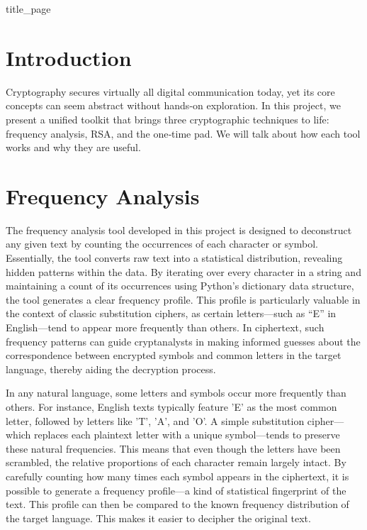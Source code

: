 \documentclass[11pt]{article}
\begin{document}
\raggedcolumns

{title_page}


\begin{multicols}{2}
	\begin{spacing}{1.125}
		\tableofcontents

		\section{Introduction}
		Cryptography secures virtually all digital communication today, yet its core concepts can seem abstract without hands‑on exploration. In this project, we present a unified toolkit that brings three cryptographic techniques to life: frequency analysis, RSA, and the one‑time pad. We will talk about how each tool works and why they are useful.


        	\section{Frequency Analysis}
       		The frequency analysis tool developed in this project is designed to deconstruct any given text by counting the occurrences of each character or symbol. Essentially, the tool converts raw text into a statistical distribution, revealing hidden patterns within the data. By iterating over every character in a string and maintaining a count of its occurrences using Python’s dictionary data structure, the tool generates a clear frequency profile. This profile is particularly valuable in the context of classic substitution ciphers, as certain letters—such as “E” in English—tend to appear more frequently than others. In ciphertext, such frequency patterns can guide cryptanalysts in making informed guesses about the correspondence between encrypted symbols and common letters in the target language, thereby aiding the decryption process.

		In any natural language, some letters and symbols occur more frequently than others. For instance, English texts typically feature 'E' as the most common letter, followed by letters like 'T', 'A', and 'O'. A simple substitution cipher—which replaces each plaintext letter with a unique symbol—tends to preserve these natural frequencies. This means that even though the letters have been scrambled, the relative proportions of each character remain largely intact. By carefully counting how many times each symbol appears in the ciphertext, it is possible to generate a frequency profile—a kind of statistical fingerprint of the text. This profile can then be compared to the known frequency distribution of the target language. This makes it easier to decipher the original text.  


\end{spacing}
\end{multicols}
\end{document}
